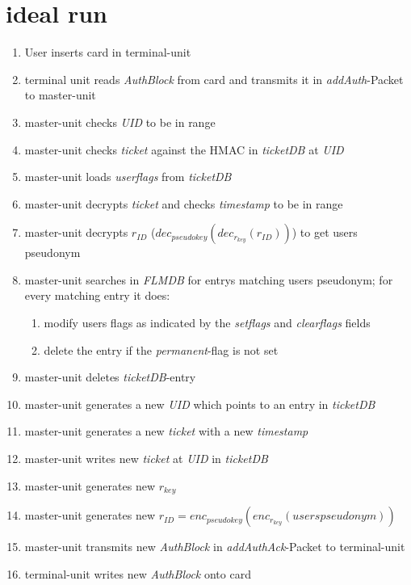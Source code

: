\section{ideal run}
 \begin{enumerate}
 \item User inserts card in terminal-unit
 \item terminal unit reads \textit{AuthBlock} from card and transmits it in \textit{addAuth}-Packet to master-unit
 \item master-unit checks \textit{UID} to be in range
 \item master-unit checks \textit{ticket} against the HMAC in \textit{ticketDB} at \textit{UID}
 \item master-unit loads \textit{userflags} from \textit{ticketDB}
 \item master-unit decrypts \textit{ticket} and checks \textit{timestamp} to be in range
 \item master-unit decrypts \textit{$r_{ID}$} ($dec_{pseudokey}(dec_{r_{key}}(r_{ID}))$) to get users pseudonym
 \item master-unit searches in \textit{FLMDB} for entrys matching users pseudonym; for every matching entry it does:
  \begin{enumerate}
  \item modify users flags as indicated by the \textit{setflags} and \textit{clearflags} fields
  \item delete the entry if the \textit{permanent}-flag is not set
  \end{enumerate}
 \item master-unit deletes \textit{ticketDB}-entry
 \item master-unit generates a new \textit{UID} which points to an entry in \textit{ticketDB}
 \item master-unit generates a new \textit{ticket} with a new \textit{timestamp}
 \item master-unit writes new \textit{ticket} at \textit{UID} in \textit{ticketDB}
 \item master-unit generates new \textit{$r_{key}$}
 \item master-unit generates new \textit{$r_{ID}$}$=enc_{pseudokey}(enc_{r_{key}}(users pseudonym))$ 
 \item master-unit transmits new \textit{AuthBlock} in \textit{addAuthAck}-Packet to terminal-unit
 \item terminal-unit writes new \textit{AuthBlock} onto card
 \end{enumerate}
